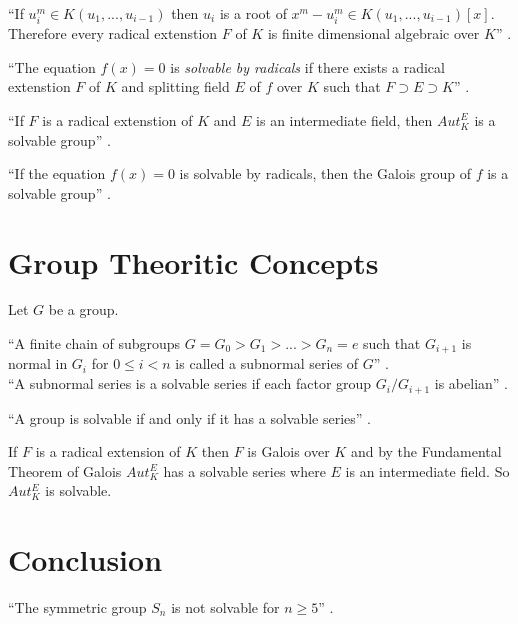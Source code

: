 \begin{remark}
``If \(u_i^m \in K(u_1,...,u_{i-1})\) then \(u_i\) is a root of \(x^m-u_i^m \in K(u_1,...,u_{i-1})[x]\). \\
Therefore every radical extenstion \(F\) of \(K\) is finite dimensional algebraic over \(K\)'' \cite{hunger}.
\end{remark}

\begin{definition}
``The equation \(f(x)=0\) is \textit{solvable by radicals} if there exists a radical extenstion \(F\) of \(K\) and splitting field \(E\) of \(f\) over \(K\) such that \(F \supset E \supset K\)'' \cite{hunger}.
\end{definition}

\begin{theorem}
``If \(F\) is a radical extenstion of \(K\) and \(E\) is an intermediate field, then \(Aut_K^E\) is a solvable group'' \cite{hunger}.
\end{theorem}

\begin{corollary}
``If the equation \(f(x)=0\) is solvable by radicals, then the Galois group of \(f\) is a solvable group'' \cite{hunger}.
\end{corollary}

\section{Group Theoritic Concepts}
Let \(G\) be a group.

\begin{definition}
``A finite chain of subgroups \(G=G_0>G_1>...>G_n={e}\) such that \(G_{i+1}\) is normal in \(G_i\) for \(0 \leq i < n\) is called a subnormal series of \(G\)'' \cite{hunger}.\\
``A subnormal series is a solvable series if each factor group \(G_i/G_{i+1}\) is abelian'' \cite{hunger}.
\end{definition}

\begin{definition}
``A group is solvable if and only if it has a solvable series'' \cite{hunger}.
\end{definition}

If \(F\) is a radical extension of \(K\) then \(F\) is Galois over \(K\) and by the Fundamental Theorem of Galois \(Aut_K^E\) has a solvable series where \(E\) is an intermediate field. So \(Aut_K^E\) is solvable.

\section{Conclusion}
\begin{theorem}
``The symmetric group \(S_n\) is not solvable for \(n \geq 5\)'' \cite{hunger}.
\end{theorem}

